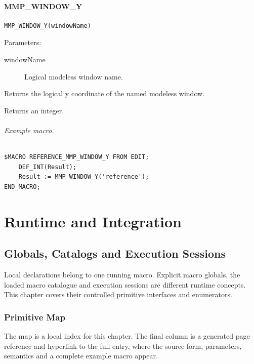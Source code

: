 \documentclass[a4paper,10pt,twoside,openany]{book}
\newenvironment{mrmacextension}{\begin{changebar}}{\end{changebar}}
\begin{document}
\begin{mrmacextension}
\label{prim:intrinsic-mmp-window-y}
\subsection*{MMP\_WINDOW\_Y}
\begin{verbatim}
MMP_WINDOW_Y(windowName)
\end{verbatim}
Parameters:
\begin{description}
\item[windowName] Logical modeless window name.
\end{description}

Returns the logical y coordinate of the named modeless window.

Returns an integer.

\paragraph{Example macro.}
\begin{verbatim}
$MACRO REFERENCE_MMP_WINDOW_Y FROM EDIT;
    DEF_INT(Result);
    Result := MMP_WINDOW_Y('reference');
END_MACRO;
\end{verbatim}
\end{mrmacextension}


\part{Runtime and Integration}

\chapter{Globals, Catalogs and Execution Sessions}

Local declarations belong to one running macro. Explicit macro globals, the loaded macro catalogue and execution sessions are different runtime concepts. This chapter covers their controlled primitive interfaces and enumerators.

\section{Primitive Map}
The map is a local index for this chapter. The final column is a generated page
reference and hyperlink to the full entry, where the source form, parameters,
semantics and a complete example macro appear.
\end{document}
